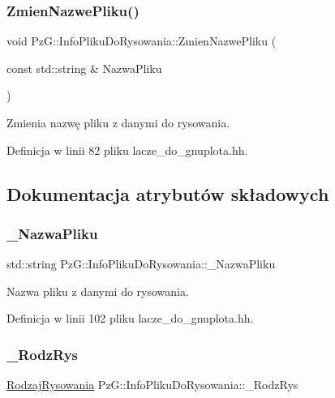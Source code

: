 \subsubsection{\texorpdfstring{ZmienNazwePliku()}{ZmienNazwePliku()}}
{\footnotesize\ttfamily void Pz\+G\+::\+Info\+Pliku\+Do\+Rysowania\+::\+Zmien\+Nazwe\+Pliku (\begin{DoxyParamCaption}\item[{const std\+::string \&}]{Nazwa\+Pliku }\end{DoxyParamCaption})\hspace{0.3cm}{\ttfamily [inline]}}

Zmienia nazwę pliku z danymi do rysowania. 

Definicja w linii 82 pliku lacze\+\_\+do\+\_\+gnuplota.\+hh.



\subsection{Dokumentacja atrybutów składowych}
\mbox{\label{class_pz_g_1_1_info_pliku_do_rysowania_a07ab06c56b9c3179e566a4123ab2a037}} 
\subsubsection{\texorpdfstring{\_NazwaPliku}{\_NazwaPliku}}
{\footnotesize\ttfamily std\+::string Pz\+G\+::\+Info\+Pliku\+Do\+Rysowania\+::\+\_\+\+Nazwa\+Pliku\hspace{0.3cm}{\ttfamily [private]}}

Nazwa pliku z danymi do rysowania. 

Definicja w linii 102 pliku lacze\+\_\+do\+\_\+gnuplota.\+hh.

\mbox{\label{class_pz_g_1_1_info_pliku_do_rysowania_ac2512f2073c66164beb2e88db31344a4}} 
\subsubsection{\texorpdfstring{\_RodzRys}{\_RodzRys}}
{\footnotesize\ttfamily \mbox{\hyperlink{namespace_pz_g_a705c92106f39b7d0c34a6739d10ff0b6}{Rodzaj\+Rysowania}} Pz\+G\+::\+Info\+Pliku\+Do\+Rysowania\+::\+\_\+\+Rodz\+Rys\hspace{0.3cm}{\ttfamily [private]}}

